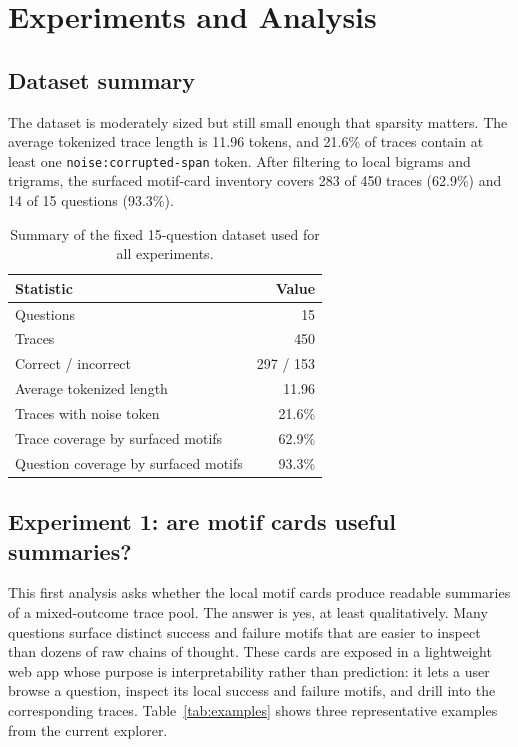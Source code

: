 \documentclass[11pt]{article}
\newcommand{\tok}[1]{\texttt{\small #1}}
\begin{document}
\section{Experiments and Analysis}

\subsection{Dataset summary}

The dataset is moderately sized but still small enough that sparsity matters. The average tokenized trace length is 11.96 tokens, and 21.6\% of traces contain at least one \tok{noise:corrupted-span} token. After filtering to local bigrams and trigrams, the surfaced motif-card inventory covers 283 of 450 traces (62.9\%) and 14 of 15 questions (93.3\%).

\begin{table}[h]
\centering
\small
\caption{Summary of the fixed 15-question dataset used for all experiments.}
\label{tab:dataset}
\begin{tabular}{@{}lr@{}}
\toprule
Statistic & Value \\
\midrule
Questions & 15 \\
Traces & 450 \\
Correct / incorrect & 297 / 153 \\
Average tokenized length & 11.96 \\
Traces with noise token & 21.6\% \\
Trace coverage by surfaced motifs & 62.9\% \\
Question coverage by surfaced motifs & 93.3\% \\
\bottomrule
\end{tabular}
\end{table}

\subsection{Experiment 1: are motif cards useful summaries?}

This first analysis asks whether the local motif cards produce readable summaries of a mixed-outcome trace pool. The answer is yes, at least qualitatively. Many questions surface distinct success and failure motifs that are easier to inspect than dozens of raw chains of thought. These cards are exposed in a lightweight web app whose purpose is interpretability rather than prediction: it lets a user browse a question, inspect its local success and failure motifs, and drill into the corresponding traces. Table~\ref{tab:examples} shows three representative examples from the current explorer.
\end{document}
